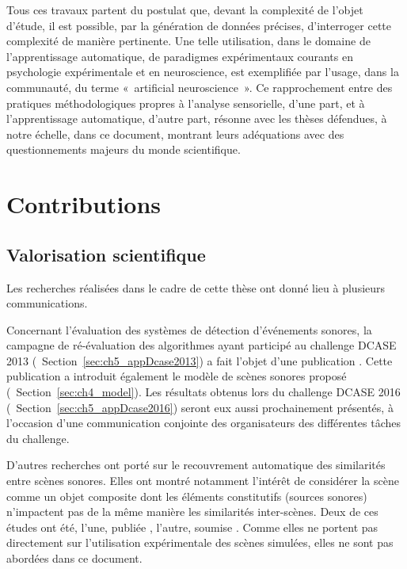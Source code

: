 Tous ces travaux partent du postulat que, devant la complexité de l'objet d'étude, il est possible, par la génération de données précises, d'interroger cette complexité de manière pertinente. Une telle utilisation, dans le domaine de l’apprentissage automatique, de paradigmes expérimentaux courants en psychologie expérimentale et en neuroscience, est exemplifiée par l’usage, dans la communauté, du terme «~artificial neuroscience~». Ce rapprochement entre des pratiques méthodologiques propres à l'analyse sensorielle, d'une part, et à l'apprentissage automatique, d'autre part, résonne avec les thèses défendues, à notre échelle, dans ce document, montrant leurs adéquations avec des questionnements majeurs du monde scientifique.


\section{Contributions}

\subsection{Valorisation scientifique}

Les recherches réalisées dans le cadre de cette thèse ont donné lieu à plusieurs communications.

Concernant l'évaluation des systèmes de détection d'événements sonores, la campagne de ré-évaluation des algorithmes ayant participé au challenge DCASE 2013 (\cf~Section~\ref{sec:ch5_appDcase2013}) a fait l'objet d'une publication \citep{lafay2016morphological}. Cette publication a introduit également le modèle de scènes sonores proposé (\cf~Section~\ref{sec:ch4_model}). Les résultats obtenus lors du challenge DCASE 2016 (\cf~Section~\ref{sec:ch5_appDcase2016}) seront eux aussi prochainement présentés, à l'occasion d'une communication conjointe des organisateurs des différentes tâches du challenge.

D'autres recherches ont porté sur le recouvrement automatique des similarités entre scènes sonores. Elles ont montré notamment l'intérêt de considérer la scène comme un objet composite dont les éléments constitutifs (sources sonores) n'impactent pas de la même manière les similarités inter-scènes. Deux de ces études ont été, l'une, publiée \citep{lagrange2015bag}, l'autre, soumise \citep{Lostenlen2016ScatteringObjet}. Comme elles ne portent pas directement sur l'utilisation expérimentale des scènes simulées, elles ne sont pas abordées dans ce document.

